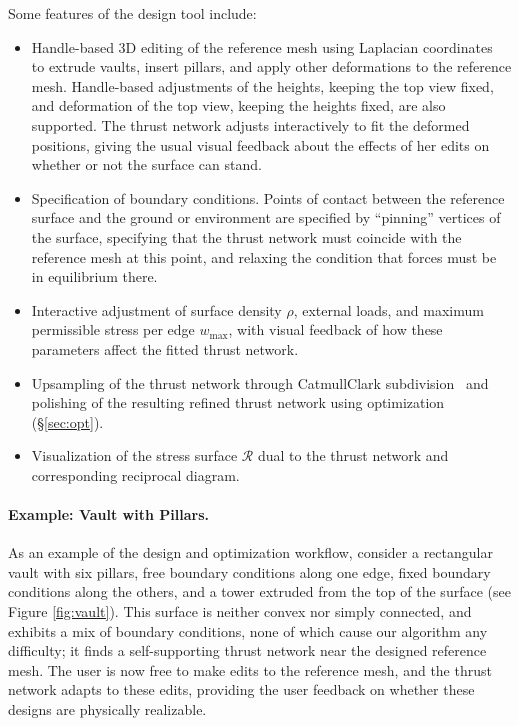 \documentclass[annual]{acmsiggraph}
\def\RR{{\mathcal R}}
\newcommand{\secref}[1]{(\S\ref{#1})}
\begin{document}
Some features of the design tool include:

\begin{itemize}

\item Handle-based 3D editing of the reference mesh using Laplacian
coordinates~\cite{Lipman2004,Sorkine2003} to extrude vaults, insert
pillars, and apply other deformations to the reference mesh. Handle-based
adjustments of the heights, keeping the top view fixed, and deformation of
the top view, keeping the heights fixed, are also supported. The thrust
network adjusts interactively to fit the deformed positions, giving the
usual visual feedback about the effects of her edits on whether or not the
surface can stand.

\item Specification of boundary conditions. Points of contact between the
reference surface and the ground or environment are specified by
``pinning'' vertices of the surface, specifying that the thrust network
must coincide with the reference mesh at this point, and relaxing the
condition that forces must be in equilibrium there.

\item Interactive adjustment of surface density $\rho$, external loads,
and maximum permissible stress per edge $w_{\textrm{max}}$, with visual
feedback of how these parameters affect the fitted thrust network.

\item Upsampling of the thrust network through Catmull\dash Clark
subdivision~\cite{catmull98} and polishing of the resulting refined thrust
network using optimization \secref{sec:opt}.

\item Visualization of the stress surface $\RR$ dual to the thrust network and corresponding reciprocal diagram.

\end{itemize}



\paragraph{Example: Vault with Pillars.} As an example of the design and optimization workflow, consider a rectangular vault with six pillars, free boundary conditions along one edge, fixed boundary conditions along the others, and a tower extruded from the top of the surface (see Figure \ref{fig:vault}). This surface is neither convex nor simply connected, and exhibits a mix of boundary conditions, none of which cause our algorithm any difficulty; it finds a self-supporting thrust network near the designed reference mesh. The user is now free to make edits to the reference mesh, and the thrust network adapts to these edits, providing the user feedback on whether these designs are physically realizable.
\end{document}
